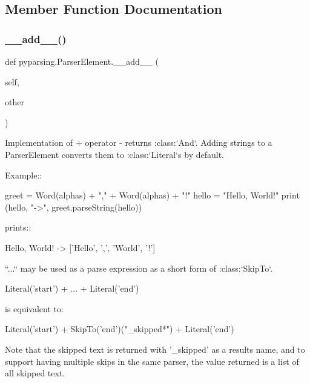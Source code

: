 \subsection{Member Function Documentation}
\mbox{\label{classpyparsing_1_1ParserElement_a21a06c8513b9a6be62c04b3f9589b985}} 
\subsubsection{\texorpdfstring{\+\_\+\+\_\+add\+\_\+\+\_\+()}{\_\_add\_\_()}}
{\footnotesize\ttfamily def pyparsing.\+Parser\+Element.\+\_\+\+\_\+add\+\_\+\+\_\+ (\begin{DoxyParamCaption}\item[{}]{self,  }\item[{}]{other }\end{DoxyParamCaption})}

\begin{DoxyVerb}Implementation of + operator - returns :class:`And`. Adding strings to a ParserElement
converts them to :class:`Literal`s by default.

Example::

    greet = Word(alphas) + "," + Word(alphas) + "!"
    hello = "Hello, World!"
    print (hello, "->", greet.parseString(hello))

prints::

    Hello, World! -> ['Hello', ',', 'World', '!']

``...`` may be used as a parse expression as a short form of :class:`SkipTo`.

    Literal('start') + ... + Literal('end')

is equivalent to:

    Literal('start') + SkipTo('end')("_skipped*") + Literal('end')

Note that the skipped text is returned with '_skipped' as a results name,
and to support having multiple skips in the same parser, the value returned is
a list of all skipped text.
\end{DoxyVerb}
 \mbox{\label{classpyparsing_1_1ParserElement_a243eaac2e462c82b0cb8fde4108afbf7}} 
